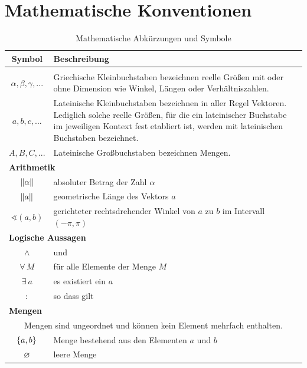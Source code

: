 \documentclass[../main/thesis.tex]{subfiles}
\begin{document}
\chapter{Mathematische Konventionen}
\label{appx:mathsymbols}

{\setlength{\doublerulesep}{1mm}%
\begin{longtable}[c]{|c|p{12cm}|}
\hline
\textbf{Symbol} & \textbf{Beschreibung} \\
\hline
\hline
\endhead
\caption*{(fortgesetzt)}
\endfoot
\caption{Mathematische Abkürzungen und Symbole}
\endlastfoot
\multicolumn{2}{|l|}{\textbf{Bezeichner}} \\
\hline
$\alpha,\beta,\gamma,...$ & Griechische Kleinbuchstaben bezeichnen reelle Größen mit oder ohne Dimension wie Winkel, Längen oder Verhältniszahlen. \\
\hline
$a,b,c,...$ & Lateinische Kleinbuchstaben bezeichnen in aller Regel Vektoren. \newline Lediglich solche reelle Größen, für die ein lateinischer Buchstabe im jeweiligen Kontext fest etabliert ist, werden mit lateinischen Buchstaben bezeichnet. \\
\hline
$A,B,C,...$ & Lateinische Großbuchstaben bezeichnen Mengen. \\
\hline
\hline
\multicolumn{2}{|l|}{\textbf{Arithmetik}} \\
\hline
$\abs[\alpha]$ & absoluter Betrag der Zahl $\alpha$ \\
\hline
$\abs[a]$ & geometrische Länge des Vektors $a$ \\
\hline
$\sphericalangle(a,b)$ & gerichteter rechtsdrehender Winkel von $a$ zu $b$ im Intervall $(-\pi,\pi)$ \\
\hline
\hline
\multicolumn{2}{|l|}{\textbf{Logische Aussagen}} \\
\hline
$\wedge$ & und \\
\hline
$\forall\, M$ & für alle Elemente der Menge $M$ \\
\hline
$\exists\ a$ & es existiert ein $a$ \\
\hline
$:$ & so dass gilt \\
\hline
\hline
\multicolumn{2}{|l|}{\textbf{Mengen}} \\
\hline
\multicolumn{2}{|p{13cm}|}{Mengen sind ungeordnet und können kein Element mehrfach enthalten.} \\
\hline
$\{a,b\}$ & Menge bestehend aus den Elementen $a$ und $b$ \\
\hline
$\varnothing$ & leere Menge \\

\end{longtable}}
\end{document}
